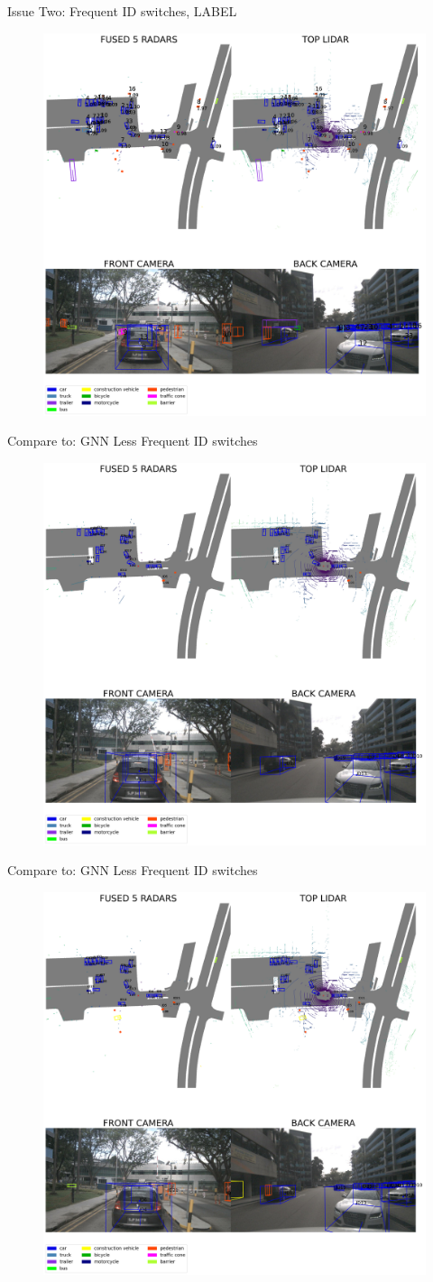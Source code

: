 \documentclass[aspectratio=169,xcolor=dvipsnames]{beamer}
\begin{document}
\begin{frame}{Issue Two: Frequent ID switches, LABEL}
    \begin{figure}
    \includegraphics[width=0.5\linewidth]{label/4.png}
    \end{figure}
\end{frame}

\begin{frame}{Compare to: GNN Less Frequent ID switches}
    \begin{figure}
    \includegraphics[width=0.5\linewidth]{GNN/1.png}
    \end{figure}
\end{frame}

\begin{frame}{Compare to: GNN Less Frequent ID switches}
    \begin{figure}
    \includegraphics[width=0.5\linewidth]{GNN/2.png}
    \end{figure}
\end{frame}
\end{document}
